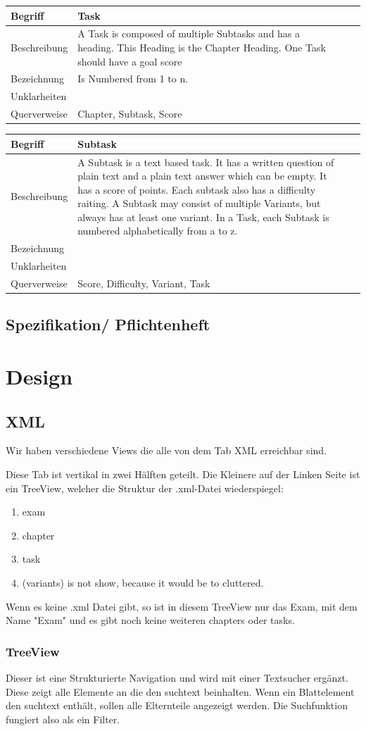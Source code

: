\documentclass[a4paper]{article}
\newcommand{\begriff}[5]{
    \begin{table}[!htbp]
    \centering
        \begin{tabularx}{\textwidth}{|lX|lX|}
        \hline
        Begriff & #1\\\hline
        Beschreibung & #2\\
        Bezeichnung & #3\\
        Unklarheiten & #4\\
        Querverweise & #5\\
        \hline
        \end{tabularx}
    \end{table}
}
\begin{document}
\begriff{Task}{A Task is composed of multiple Subtasks and has a heading. This Heading is the Chapter Heading. One Task should have a goal score}{Is Numbered from 1 to n.}{}{Chapter, Subtask, Score}

\begriff{Subtask}{A Subtask is a text based task. It has a written question of plain text and a plain text answer which can be empty. It has a score of points. Each subtask also has a difficulty raiting. A Subtask may consist of multiple Variants, but always has at least one variant. In a Task, each Subtask is numbered alphabetically from a to z.}{}{}{Score, Difficulty, Variant, Task}

\subsection{Spezifikation/ Pflichtenheft}

\pagebreak
\section{Design}

\subsection{XML}

Wir haben verschiedene Views die alle von dem Tab XML erreichbar sind.

Diese Tab ist vertikal in zwei Hälften geteilt. Die Kleinere auf der Linken Seite ist ein TreeView, welcher die Struktur der .xml-Datei wiederspiegel:

\begin{enumerate}
    \item exam
    \item chapter
    \item task
    \item (variants) is not show, because it would be to cluttered.
\end{enumerate}

Wenn es keine .xml Datei gibt, so ist in diesem TreeView nur das Exam, mit dem Name "Exam" und es gibt noch keine weiteren chapters oder tasks.

\subsubsection{TreeView}

Dieser ist eine Strukturierte Navigation und wird mit einer Textsucher ergänzt. Diese zeigt alle Elemente an die den suchtext beinhalten. Wenn ein Blattelement den suchtext enthält, sollen alle Elternteile angezeigt werden. Die Suchfunktion fungiert also als ein Filter.
\end{document}
